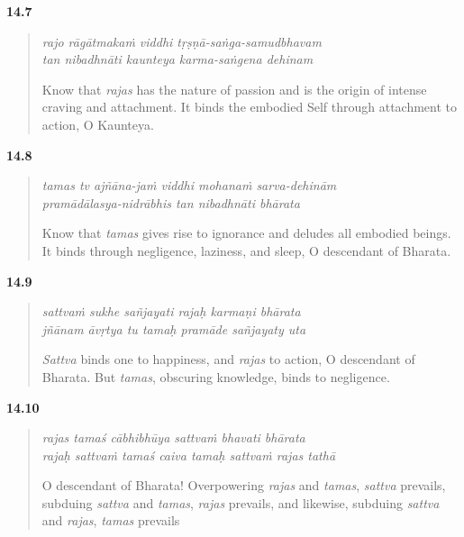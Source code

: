 \par\noindent\textbf{14.7}\par
\begin{verse}
\textit{rajo rāgātmakaṁ viddhi tṛṣṇā-saṅga-samudbhavam} \\
\textit{tan nibadhnāti kaunteya karma-saṅgena dehinam}

\noindent Know that \textit{rajas} has the nature of passion and is the origin of intense craving and attachment. It binds the embodied Self through attachment to action, O Kaunteya.
\end{verse}
\par



\par\noindent\textbf{14.8}\par
\begin{verse}
\textit{tamas tv ajñāna-jaṁ viddhi mohanaṁ sarva-dehinām} \\
\textit{pramādālasya-nidrābhis tan nibadhnāti bhārata}

\noindent Know that \textit{tamas} gives rise to ignorance and deludes all embodied beings. It binds through negligence, laziness, and sleep, O descendant of Bharata.
\end{verse}
\par



\par\noindent\textbf{14.9}\par
\begin{verse}
\textit{sattvaṁ sukhe sañjayati rajaḥ karmaṇi bhārata} \\
\textit{jñānam āvṛtya tu tamaḥ pramāde sañjayaty uta}

\noindent \textit{Sattva} binds one to happiness, and \textit{rajas} to action, O descendant of Bharata. But \textit{tamas}, obscuring knowledge, binds to negligence.
\end{verse}
\par



\par\noindent\textbf{14.10}\par
\begin{verse}
\textit{rajas tamaś cābhibhūya sattvaṁ bhavati bhārata} \\
\textit{rajaḥ sattvaṁ tamaś caiva tamaḥ sattvaṁ rajas tathā}

\noindent O descendant of Bharata! Overpowering \textit{rajas} and \textit{tamas}, \textit{sattva} prevails, subduing \textit{sattva} and \textit{tamas}, \textit{rajas} prevails, and likewise, subduing \textit{sattva} and \textit{rajas}, \textit{tamas} prevails
\end{verse}
\par




